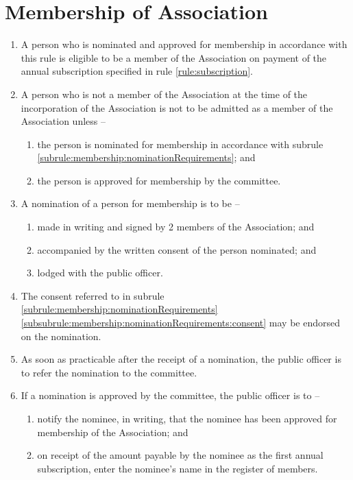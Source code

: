 \section{Membership of Association}
\label{rule:membership}

\begin{enumerate}
	\item A person who is nominated and approved for membership in accordance with this rule is eligible to be a member of the Association on payment of the annual subscription specified in rule \ref{rule:subscription}.
	
	\item A person who is not a member of the Association at the time of the incorporation of the Association is not to be admitted as a member of the Association unless --
	\begin{enumerate}
		\item the person is nominated for membership in accordance with subrule \ref{subrule:membership:nominationRequirements}; and
		\item the person is approved for membership by the committee.
	\end{enumerate}
	
	\item \label{subrule:membership:nominationRequirements} A nomination of a person for membership is to be --
	\begin{enumerate}
		\item made in writing and signed by 2 members of the Association; and
		\item \label{subsubrule:membership:nominationRequirements:consent} accompanied by the written consent of the person nominated; and
		\item lodged with the public officer.
	\end{enumerate}
	
	\item The consent referred to in subrule \ref{subrule:membership:nominationRequirements} \ref{subsubrule:membership:nominationRequirements:consent} may be endorsed on the nomination.
	\item As soon as practicable after the receipt of a nomination, the public officer is to refer the nomination to the committee.
	
	\item If a nomination is approved by the committee, the public officer is to --
	\begin{enumerate}
		\item notify the nominee, in writing, that the nominee has been approved for membership of the Association; and
		\item on receipt of the amount payable by the nominee as the first annual subscription, enter the nominee's name in the register of members.
	\end{enumerate}
	

\end{enumerate}
